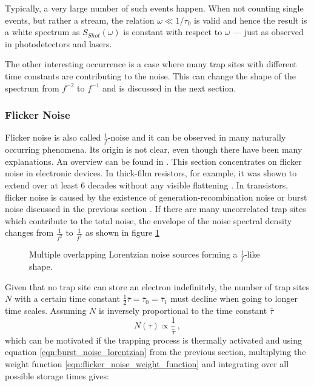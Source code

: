 Typically, a very large number of such events happen. When not counting single events, but rather a stream, the relation $\omega \ll 1/\tau_0$ is valid and hence the result is a white spectrum as $S_{Shot}(\omega)$ is constant with respect to $\omega$ --- just as observed in photodetectors and lasers.

The other interesting occurrence is a case where many trap sites with different time constants are contributing to the noise. This can change the shape of the spectrum from $f^{-2}$ to $f^{-1}$ and is discussed in the next section.

\clearpage
\subsubsection{Flicker Noise}%
\label{sec:flicker_noise}
Flicker noise is also called $\frac 1 f$-noise and it can be observed in many naturally occurring phenomena. Its origin is not clear, even though there have been many explanations. An overview can be found in \cite{flicker_noise_overview, flicker_noise_overview2, origins_1_f_noise}. This section concentrates on flicker noise in electronic devices. In thick-film resistors, for example, it was shown to extend over at least 6 decades without any visible flattening \cite{1_f_noise_thick_film}. In transistors, flicker noise is caused by the existence of generation-recombination noise or burst noise discussed in the previous section \cite{origins_1_f_noise}. If there are many uncorrelated trap sites which contribute to the total noise, the envelope of the noise spectral density changes from $\frac{1}{f^2}$ to $\frac{1}{f^1}$ as shown in figure \ref{fig:flicker_noise_evelope}

\begin{figure}[hb]
    \centering
    
    \caption{Multiple overlapping Lorentzian noise sources forming a $\frac 1 f$-like shape.}
    \label{fig:flicker_noise_evelope}
\end{figure}

Given that no trap site can store an electron indefinitely, the number of trap sites $N$ with a certain time constant $\frac 1 2 \bar \tau = \bar \tau_0 = \bar \tau_1$ must decline when going to longer time scales. Assuming $N$ is inversely proportional to the time constant $\bar \tau$
\begin{equation}
    N(\tau) \propto \frac{1}{\bar \tau}\,, \label{eqn:flicker_noise_weight_function}
\end{equation}
which can be motivated if the trapping process is thermally activated \cite{1_f_noise_motivation} and using equation \ref{eqn:burst_noise_lorentzian} from the previous section, multiplying the weight function \ref{eqn:flicker_noise_weight_function} and integrating over all possible storage times gives:

